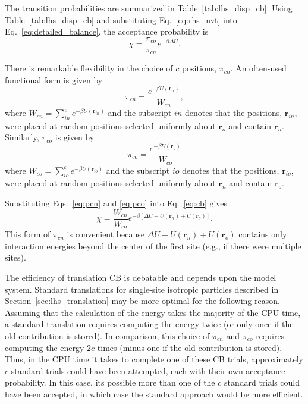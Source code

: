 \documentclass[
  9pt,
  bestpractices,
]{livecoms}
\begin{document}
The transition probabilities are summarized in Table~\ref{tab:lhs_disp_cb}.
Using Table~\ref{tab:lhs_disp_cb} and substituting Eq.~\ref{eq:rhs_nvt} into Eq.~\ref{eq:detailed_balance}, the acceptance probability is
\begin{equation}
\chi = \frac{\pi_{co}}{\pi_{cn}}e^{-\beta \Delta U}.
\label{eq:cb}
\end{equation}

There is remarkable flexibility in the choice of $c$ positions, $\pi_{cn}$.
An often-used functional form is given by
\begin{equation}
\pi_{cn}=\frac{e^{-\beta U(\mathbf{r}_n)}}{W_{cn}},
\label{eq:pcn}
\end{equation}
where $W_{cn}=\sum_{in}^c e^{-\beta U(\mathbf{r}_{in})}$ and the subscript $in$ denotes that the positions, $\mathbf{r}_{in}$, were placed at random positions selected uniformly about $\mathbf{r}_o$ and contain $\mathbf{r}_n$.
Similarly, $\pi_{co}$ is given by
\begin{equation}
\pi_{co}=\frac{e^{-\beta U(\mathbf{r}_o)}}{W_{co}}
\label{eq:pco}
\end{equation}
where $W_{co}=\sum_{io}^c e^{-\beta U(\mathbf{r}_{io})}$ and the subscript $io$ denotes that the positions, $\mathbf{r}_{io}$, were placed at random positions selected uniformly about $\mathbf{r}_n$ and contain $\mathbf{r}_o$.

Substituting Eqs.~\ref{eq:pcn} and \ref{eq:pco} into Eq.~\ref{eq:cb} gives
\begin{equation}
\chi = \frac{W_{cn}}{W_{co}}e^{-\beta[\Delta U - U(\mathbf{r}_n) + U(\mathbf{r}_o)]}.
\end{equation}
This form of $\pi_{cn}$ is convenient because $\Delta U - U(\mathbf{r}_n) + U(\mathbf{r}_o)$ contains only interaction energies beyond the center of the first site (e.g., if there were multiple sites).

The efficiency of translation CB is debatable and depends upon the model system.
Standard translations for single-site isotropic particles described in Section~\ref{sec:lhs_translation} may be more optimal for the following reason.
Assuming that the calculation of the energy takes the majority of the CPU time, a standard translation requires computing the energy twice (or only once if the old contribution is stored).
In comparison, this choice of $\pi_{cn}$ and $\pi_{co}$ requires computing the energy $2c$ times (minus one if the old contribution is stored).
Thus, in the CPU time it takes to complete one of these CB trials, approximately $c$ standard trials could have been attempted, each with their own acceptance probability.
In this case, its possible more than one of the $c$ standard trials could have been accepted, in which case the standard approach would be more efficient.
\end{document}
